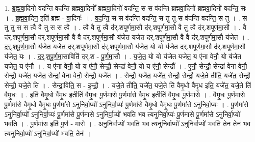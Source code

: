 \documentclass[17pt]{extarticle}
\begin{document}
1. ब्र॒ह्म॒वा॒दिनो॑ वदन्ति वदन्ति ब्रह्मवा॒दिनो᳚ ब्रह्मवा॒दिनो॑ वदन्ति॒ स स व॑दन्ति ब्रह्मवा॒दिनो᳚ ब्रह्मवा॒दिनो॑ वदन्ति॒ सः । . ब्र॒ह्म॒वा॒दिन॒ इति॑ ब्रह्म - वा॒दिनः॑ । . व॒द॒न्ति॒ स स व॑दन्ति वदन्ति॒ स तु तु स व॑दन्ति वदन्ति॒ स तु । . स तु तु स स त्वै वै तु स स त्वै । . त्वै वै तु त्वै द॑र्.शपूर्णमा॒सौ द॑र्.शपूर्णमा॒सौ वै तु त्वै द॑र्.शपूर्णमा॒सौ । . वै द॑र्.शपूर्णमा॒सौ द॑र्.शपूर्णमा॒सौ वै वै द॑र्.शपूर्णमा॒सौ य॑जेत यजेत दर्.शपूर्णमा॒सौ वै वै द॑र्.शपूर्णमा॒सौ य॑जेत । . द॒र्॒.श॒पू॒र्ण॒मा॒सौ य॑जेत यजेत दर्.शपूर्णमा॒सौ द॑र्.शपूर्णमा॒सौ य॑जेत॒ यो यो य॑जेत दर्.शपूर्णमा॒सौ द॑र्.शपूर्णमा॒सौ य॑जेत॒ यः । . द॒र्॒.श॒पू॒र्ण॒मा॒साविति॑ दर्.श - पू॒र्ण॒मा॒सौ । . य॒जे॒त॒ यो यो य॑जेत यजेत॒ य ए॑ना वेनौ॒ यो य॑जेत यजेत॒ य ए॑नौ । . य ए॑ना वेनौ॒ यो य ए॑नौ॒ सेन्द्रौ॒ सेन्द्रा॑ वेनौ॒ यो य ए॑नौ॒ सेन्द्रौ᳚ । . ए॒नौ॒ सेन्द्रौ॒ सेन्द्रा॑ वेना वेनौ॒ सेन्द्रौ॒ यजे॑त॒ यजे॑त॒ सेन्द्रा॑ वेना वेनौ॒ सेन्द्रौ॒ यजे॑त । . सेन्द्रौ॒ यजे॑त॒ यजे॑त॒ सेन्द्रौ॒ सेन्द्रौ॒ यजे॒ते तीति॒ यजे॑त॒ सेन्द्रौ॒ सेन्द्रौ॒ यजे॒ते ति॑ । . सेन्द्रा॒विति॒ स - इ॒न्द्रौ॒ । . यजे॒ते तीति॒ यजे॑त॒ यजे॒ते ति॑ वैमृ॒धो वै॑मृ॒ध इति॒ यजे॑त॒ यजे॒ते ति॑ वैमृ॒धः । . इति॑ वैमृ॒धो वै॑मृ॒ध इतीति॑ वैमृ॒धः पू॒र्णमा॑से पू॒र्णमा॑से वैमृ॒ध इतीति॑ वैमृ॒धः पू॒र्णमा॑से । . वै॒मृ॒धः पू॒र्णमा॑से पू॒र्णमा॑से वैमृ॒धो वै॑मृ॒धः पू॒र्णमा॑से ऽनुनिर्वा॒प्यो॑ ऽनुनिर्वा॒प्यः॑ पू॒र्णमा॑से वैमृ॒धो वै॑मृ॒धः पू॒र्णमा॑से ऽनुनिर्वा॒प्यः॑ । . पू॒र्णमा॑से ऽनुनिर्वा॒प्यो॑ ऽनुनिर्वा॒प्यः॑ पू॒र्णमा॑से पू॒र्णमा॑से ऽनुनिर्वा॒प्यो॑ भवति भव त्यनुनिर्वा॒प्यः॑ पू॒र्णमा॑से पू॒र्णमा॑से ऽनुनिर्वा॒प्यो॑ भवति । . पू॒र्णमा॑स॒ इति॑ पू॒र्ण - मा॒से॒ । . अ॒नु॒नि॒र्वा॒प्यो॑ भवति भव त्यनुनिर्वा॒प्यो॑ ऽनुनिर्वा॒प्यो॑ भवति॒ तेन॒ तेन॑ भव त्यनुनिर्वा॒प्यो॑ ऽनुनिर्वा॒प्यो॑ भवति॒ तेन॑ । \newline
\end{document}
